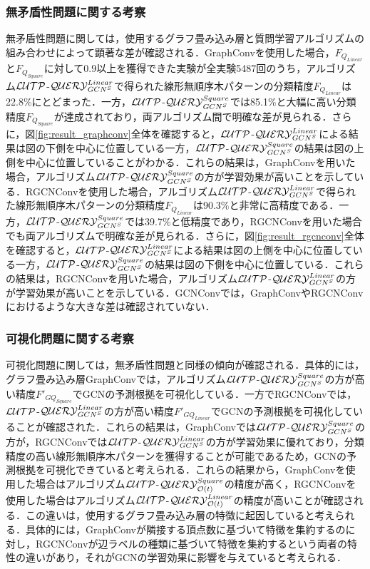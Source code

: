 \subsubsection*{無矛盾性問題に関する考察}
無矛盾性問題に関しては，使用するグラフ畳み込み層と質問学習アルゴリズムの組み合わせによって顕著な差が確認される．GraphConvを使用した場合，$F_{Q_{Linear}}$と$F_{Q_{Square}}$に対して0.9以上を獲得できた実験が全実験5487回のうち，アルゴリズム${\cal LUTP}$-${\cal QUERY}_{GCN^S}^{Linear}$で得られた線形無順序木パターンの分類精度$F_{Q_{Linear}}$は22.8\%にとどまった．一方，${\cal LUTP}$-${\cal QUERY}_{GCN^S}^{Square}$では85.1\%と大幅に高い分類精度$F_{Q_{Square}}$が達成されており，両アルゴリズム間で明確な差が見られる．さらに，図\ref{fig:result_graphconv}全体を確認すると，${\cal LUTP}$-${\cal QUERY}_{GCN^S}^{Linear}$による結果は図の下側を中心に位置している一方，${\cal LUTP}$-${\cal QUERY}_{GCN^S}^{Square}$の結果は図の上側を中心に位置していることがわかる．これらの結果は，GraphConvを用いた場合，アルゴリズム${\cal LUTP}$-${\cal QUERY}_{GCN^S}^{Square}$の方が学習効果が高いことを示している．RGCNConvを使用した場合，アルゴリズム${\cal LUTP}$-${\cal QUERY}_{GCN^S}^{Linear}$で得られた線形無順序木パターンの分類精度$F_{Q_{Linear}}$は90.3\%と非常に高精度である．一方，${\cal LUTP}$-${\cal QUERY}_{GCN^S}^{Square}$では39.7\%と低精度であり，RGCNConvを用いた場合でも両アルゴリズムで明確な差が見られる．さらに，図\ref{fig:result_rgcnconv}全体を確認すると，${\cal LUTP}$-${\cal QUERY}_{GCN^S}^{Linear}$による結果は図の上側を中心に位置している一方，${\cal LUTP}$-${\cal QUERY}_{GCN^S}^{Square}$の結果は図の下側を中心に位置している．これらの結果は，RGCNConvを用いた場合，アルゴリズム${\cal LUTP}$-${\cal QUERY}_{GCN^S}^{Linear}$の方が学習効果が高いことを示している．GCNConvでは，GraphConvやRGCNConvにおけるような大きな差は確認されていない．

\subsubsection*{可視化問題に関する考察}
可視化問題に関しては，無矛盾性問題と同様の傾向が確認される．具体的には，グラフ畳み込み層GraphConvでは，アルゴリズム${\cal LUTP}$-${\cal QUERY}_{GCN^S}^{Square}$の方が高い精度${F'}_{GQ_{Square}}$でGCNの予測根拠を可視化している．一方でRGCNConvでは，${\cal LUTP}$-${\cal QUERY}_{GCN^S}^{Linear}$の方が高い精度${F'}_{GQ_{Linear}}$でGCNの予測根拠を可視化していることが確認された．これらの結果は，GraphConvでは${\cal LUTP}$-${\cal QUERY}_{GCN^S}^{Square}$の方が，RGCNConvでは${\cal LUTP}$-${\cal QUERY}_{GCN^S}^{Linear}$の方が学習効果に優れており，分類精度の高い線形無順序木パターンを獲得することが可能であるため，GCNの予測根拠を可視化できていると考えられる．これらの結果から，GraphConvを使用した場合はアルゴリズム${\cal LUTP}$-${\cal QUERY}_{{\cal O}(t)}^{Square}$の精度が高く，RGCNConvを使用した場合はアルゴリズム${\cal LUTP}$-${\cal QUERY}_{{\cal O}(t)}^{Linear}$の精度が高いことが確認される．この違いは，使用するグラフ畳み込み層の特徴に起因していると考えられる．具体的には，GraphConvが隣接する頂点数に基づいて特徴を集約するのに対し，RGCNConvが辺ラベルの種類に基づいて特徴を集約するという両者の特性の違いがあり，それがGCNの学習効果に影響を与えていると考えられる．

